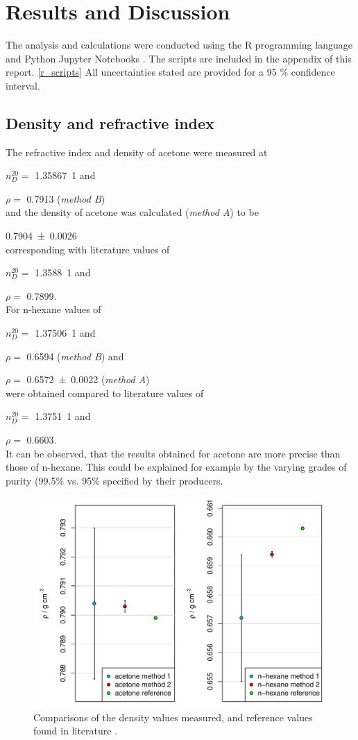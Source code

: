 
\section{Results and Discussion}
The analysis and calculations were conducted using the R programming language \cite{R} and Python Jupyter Notebooks \cite{IPython:2007}. The scripts are included in the appendix of this report. \ref{r_scripts} All uncertainties stated are provided for a 95 \% confidence interval.


\subsection{Density and refractive index}

The refractive index and density of acetone were measured at 

$n_D^{20} =$ \qty{1.35867}{1} and 

$\rho = $ \qty{0.7913}{\density} (\textit{method B}) 
\\and the density of acetone was calculated (\textit{method A}) to be 

\qty{0.7904 \pm 0.0026}{\density} 
\\corresponding with literature values of 

$n_D^{20} =$ \qty{1.3588}{1} and 

$\rho = $ \qty{0.7899}{\density}. \cite{meister} 
\\For n-hexane values of 

$n_D^{20} =$ \qty{1.37506}{1} and 

$\rho = $ \qty{0.6594}{\density} (\textit{method B}) and 

$\rho = $ \qty{0.6572 \pm 0.0022}{\density} (\textit{method A}) 
\\were obtained compared to literature values of 

$n_D^{20} =$ \qty{1.3751}{1} and 

$\rho = $ \qty{0.6603}{\density}. \cite{meister} 
\\It can be observed, that the results obtained for acetone are more precise than those of n-hexane. This could be explained for example by the varying grades of purity (99.5\% vs. 95\% specified by their producers.
\begin{figure}[H]
    \centering
    \includegraphics[width=.5\textwidth]{figures/rho-comparison.pdf}
    \caption{Comparisons of the density values measured, and reference values found in literature \cite{meister}.}
    \label{fig:rho_comp}
\end{figure}


